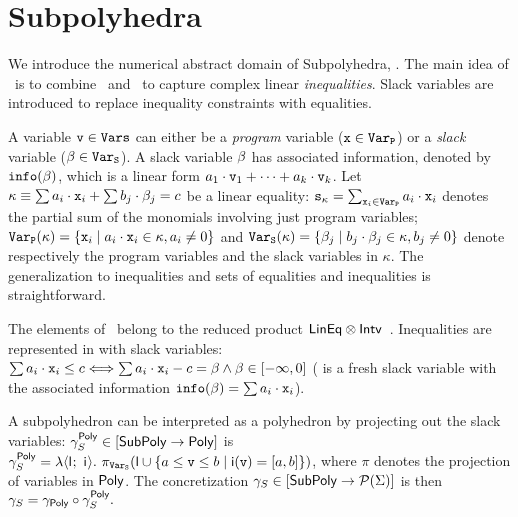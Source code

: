 \documentclass{llncs}
\begin{document}
\section{Subpolyhedra}

We introduce the numerical abstract domain of Subpolyhedra, \Subpoly.
The main idea of \Subpoly\ is to combine \Intervals\ and \Lineq\ to capture complex linear \emph{inequalities}.
Slack variables are introduced to replace inequality constraints with equalities. 


 A variable $\mathtt{v} \in \mathtt{Vars}$ can  either be  a \emph{program} variable ($\mathtt{x} \in \mathtt{Var}_\mathtt{P}$) or a \emph{slack} variable ($\beta_{} \in \mathtt{Var}_\mathtt{S}$).
A slack variable $\beta_{}$  has associated information, denoted by $\mathtt{info}(\beta_{})$,  which is a linear form  $a_1 \cdot \mathtt{v}_1 + \dots + a_k \cdot \mathtt{v}_k$.
Let  $\kappa \equiv \sum a_i \cdot \mathtt{x}_{i} +  \sum b_j \cdot \beta_{j} = c$ be a linear equality:
$\mathtt{s_\kappa} = \sum_{\mathtt{x}_i \in \mathtt{Var}_\mathtt{P}} a_i \cdot \mathtt{x}_i$ denotes the partial sum of the monomials involving just program variables;
 $\mathtt{Var}_\mathtt{P}(\kappa) = \{ \mathtt{x}_{i} \mid a_i \cdot \mathtt{x}_{i} \in \kappa, a_i \neq 0  \}$ and   $\mathtt{Var}_\mathtt{S}(\kappa) = \{ \beta_{j} \mid b_j \cdot \beta_{j} \in \kappa, b_j \neq 0  \}$ denote respectively the program variables and the slack variables  in $\kappa$.
The generalization to inequalities and sets of equalities and inequalities is straightforward.



The elements of \SubPoly\ belong to the reduced product $\mathsf{LinEq} \otimes \mathsf{Intv}$~\cite{CousotCousot79}.
Inequalities are represented in \SubPoly{}  with slack variables:
$\sum a_i \cdot \mathtt{x}_{i} \leq c \Longleftrightarrow \sum a_i \cdot \mathtt{x}_{i} - c = \beta_{} \wedge \beta_{} \in [-\infty, 0]$ (\slackvar{} is a fresh slack variable with the  associated information  $\mathtt{info}(\beta_{}) = \sum a_i \cdot \mathtt{x}_{i}$). 



A subpolyhedron can be interpreted as a polyhedron by projecting out the slack variables: $\gamma^{\mathsf{Poly}}_{S} \in [\mathsf{SubPoly} \rightarrow\mathsf{Poly}]$ is
$
\gamma^\Poly_{S} = \lambda \subpolyPair{}{}.\ \pi_{\VarSlack}(\ael{l} \cup \{ a \leq \var \leq b \mid \ael{i}(\var) = [a, b]  \} )
$, where $\pi$ denotes the projection of variables in $\mathsf{Poly}$.
The concretization   $\gamma_{S} \in [\mathsf{SubPoly} \rightarrow\mathcal{P}{(\Sigma)}]$ is then
$
\gamma_{S} = \gamma_{\mathsf{Poly}} \circ \gamma^{\mathsf{Poly}}_{S}.
$
\end{document}
